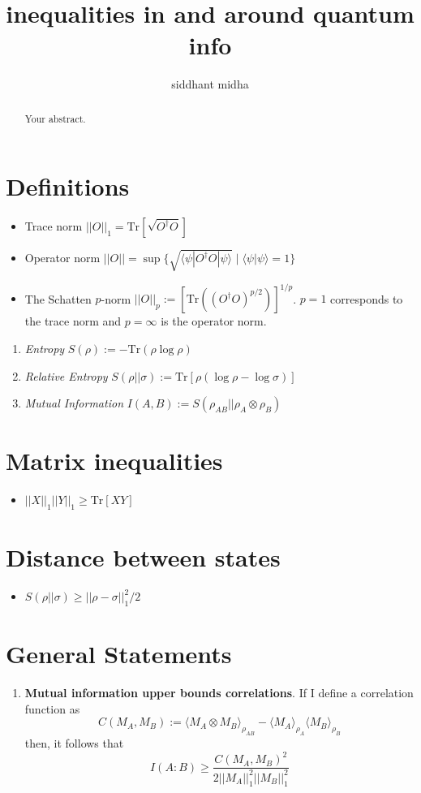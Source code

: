 \documentclass{article}
\title{inequalities in and around quantum info}
\author{siddhant midha}
\begin{document}
\maketitle

\begin{abstract}
Your abstract.
\end{abstract}

\section{Definitions}
\begin{itemize}
    \item Trace norm $||O||_1 = \text{Tr}[\sqrt{O^{\dagger}O}]$
    \item Operator norm $||O|| = \sup\{\sqrt{\langle\psi|O^{\dagger}O|\psi\rangle} \mid \langle\psi|\psi\rangle = 1\}$
    \item The Schatten $p$-norm $||O||_p := [\text{Tr}((O^{\dagger}O)^{p/2})]^{1/p}$. $p=1$ corresponds to the trace norm and $p=\infty$ is the operator norm.
\end{itemize}

\begin{enumerate}
    \item \textit{Entropy} $S(\rho) := -\text{Tr}(\rho\log{\rho})$
    \item \textit{Relative Entropy} $S(\rho||\sigma) := \text{Tr}[\rho(\log{\rho} - \log{\sigma})]$
    \item \textit{Mutual Information} $I(A,B) := S(\rho_{AB}||\rho_A \otimes \rho_B)$
\end{enumerate}
\section{Matrix inequalities}
\begin{itemize}
    \item $||X||_1||Y||_1 \geq \text{Tr}[XY]$
\end{itemize}


\section{Distance between states}
\begin{itemize}
    \item $S(\rho||\sigma) \geq ||\rho-\sigma||_1^2/2$
\end{itemize}

\section{General Statements}
\begin{enumerate}
    \item \textbf{Mutual information upper bounds correlations}. If I define a correlation function as
    \[C(M_A,M_B) := \langle M_A\otimes M_B\rangle_{\rho_{AB}} - \langle M_A\rangle_{\rho_A}\langle M_B \rangle_{\rho_B}\]
    then, it follows that 
    \[I(A:B) \geq \frac{C(M_A,M_B)^2}{2 ||M_A||_1^2 ||M_B||_1^2}\]

\end{enumerate}
\end{document}
